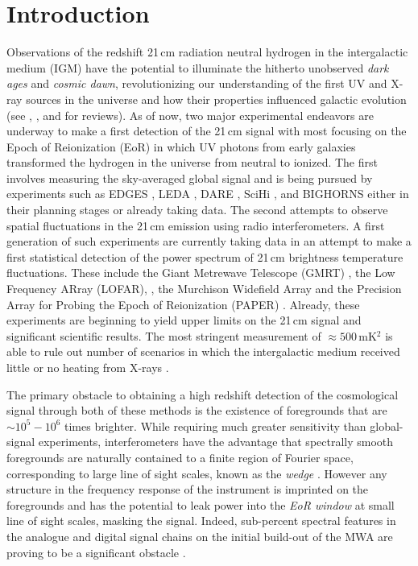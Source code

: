 \documentclass[twocolumn]{emulateapj}
\begin{document}
\section{Introduction}
Observations of the redshift 21\,cm radiation neutral hydrogen in the intergalactic medium (IGM) have the potential to illuminate the hitherto unobserved {\it dark ages} and {\it cosmic dawn}, revolutionizing our understanding of the first UV and X-ray sources in the universe and how their properties influenced galactic evolution (see \citet{Furlanetto:2006Review}, \citet{Morales:2010}, and \citet{Pritchard:2012} for reviews). As of now, two major experimental endeavors are underway to make a first detection of the 21\,cm signal with most focusing on the Epoch of Reionization (EoR) in which UV photons from early galaxies transformed the hydrogen in the universe from neutral to ionized. The first involves measuring the sky-averaged global signal and is being pursued by experiments such as EDGES \citep{Bowman:2010}, LEDA \citep{Greenhill:2012,Bernardi:2015}, DARE \citep{Burns:2012}, SciHi \citep{Voytek:2014}, and BIGHORNS \citep{Sokolowski:2015} either in their planning stages or already taking data. The second attempts to observe spatial  fluctuations in the 21\,cm emission using radio interferometers. A first generation of such experiments are currently taking data in an attempt to make a first statistical detection of the power spectrum of 21\,cm brightness temperature fluctuations. These include the Giant Metrewave Telescope (GMRT)  \citep{Paciga:2013}, the Low Frequency ARray (LOFAR), \citep{VanHaarlem:2013}, the Murchison Widefield Array \citep{Tingay:2013a} and the Precision Array for Probing the Epoch of Reionization (PAPER) \citep{Parsons:2010}. Already, these experiments are beginning to yield upper limits on the 21\,cm signal \citep{Dillon:2013,Parsons:2014,Jacobs:2015,Dillon:2015,EwallWice:2015a} and significant scientific results. The most stringent measurement of $\approx 500$\,mK$^2$ \citep{Ali:2015} is able to rule out number of scenarios in which the intergalactic medium received little or no heating from X-rays \citep{Pober:2015,Greig:2015b}. 

The primary obstacle to obtaining a high redshift detection of the cosmological signal through both of these methods is the existence of foregrounds that are $\sim 10^5-10^6$ times brighter. While requiring much greater sensitivity than global-signal experiments, interferometers have the advantage that spectrally smooth foregrounds are naturally contained to a finite region of Fourier space, corresponding to large line of sight scales, known as the {\it wedge} \citep{Datta:2010,Vedantham:2012,Parsons:2012,Thyagarajan:2013,Liu:2014a,Liu:2014b}. However any structure in the frequency response of the instrument is imprinted on the foregrounds and has the potential to leak power into the {\it EoR window} at small line of sight scales, masking the signal. Indeed, sub-percent spectral features in the analogue and digital signal chains on the initial build-out of the MWA are proving to be a significant obstacle \citep{Dillon:2015b,EwallWice:2015a,Beardsley:2015b}. 
\end{document}

